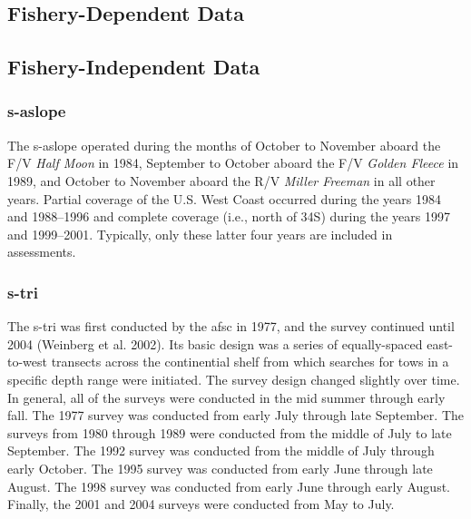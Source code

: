 \documentclass[11pt,
  letterpaper,
]{article}
\begin{document}
\hypertarget{fishery-dependent-data}{%
\subsection{Fishery-Dependent Data}\label{fishery-dependent-data}}

\hypertarget{fishery-independent-data}{%
\subsection{Fishery-Independent Data}\label{fishery-independent-data}}

\hypertarget{section}{%
\subsubsection{\texorpdfstring{\acrlong{s-aslope}}{}}\label{section}}

The \gls{s-aslope} operated during the months of October to November aboard the F\slash V \emph{Half Moon} in 1984, September to October aboard the F\slash V \emph{Golden Fleece} in 1989, and October to November aboard the R\slash V \emph{Miller Freeman} in all other years. Partial coverage of the U.S. West Coast occurred during the years 1984 and 1988--1996 and complete coverage (i.e., north of 34\textquotesingle S) during the years 1997 and 1999--2001. Typically, only these latter four years are included in assessments.

\hypertarget{section-1}{%
\subsubsection{\texorpdfstring{\acrlong{s-tri}}{}}\label{section-1}}

The \gls{s-tri} was first conducted by the \gls{afsc} in 1977, and the survey continued until 2004 (Weinberg et al. 2002). Its basic design was a series of equally-spaced east-to-west transects across the continential shelf from which searches for tows in a specific depth range were initiated. The survey design changed slightly over time. In general, all of the surveys were conducted in the mid summer through early fall. The 1977 survey was conducted from early July through late September. The surveys from 1980 through 1989 were conducted from the middle of July to late September. The 1992 survey was conducted from the middle of July through early October. The 1995 survey was conducted from early June through late August. The 1998 survey was conducted from early June through early August. Finally, the 2001 and 2004 surveys were conducted from May to July.
\end{document}
